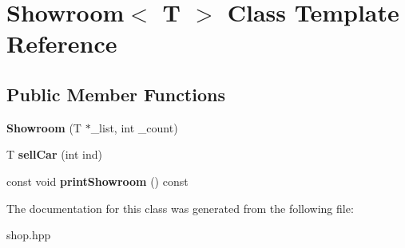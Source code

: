 \hypertarget{classShowroom}{}\section{Showroom$<$ T $>$ Class Template Reference}
\label{classShowroom}
\subsection*{Public Member Functions}
\begin{DoxyCompactItemize}
\item 
{\bfseries Showroom} (T $\ast$\+\_\+list, int \+\_\+count)\hypertarget{classShowroom_a36b709ae9bb3c4655cc4d711e140ca12}{}\label{classShowroom_a36b709ae9bb3c4655cc4d711e140ca12}

\item 
T {\bfseries sell\+Car} (int ind)\hypertarget{classShowroom_a77b6b2bc40b276cd1b4a0e17cce61e75}{}\label{classShowroom_a77b6b2bc40b276cd1b4a0e17cce61e75}

\item 
const void {\bfseries print\+Showroom} () const \hypertarget{classShowroom_a2fb6dc8440b50c4dd668a1e5518821db}{}\label{classShowroom_a2fb6dc8440b50c4dd668a1e5518821db}

\end{DoxyCompactItemize}


The documentation for this class was generated from the following file\+:\begin{DoxyCompactItemize}
\item 
shop.\+hpp\end{DoxyCompactItemize}

